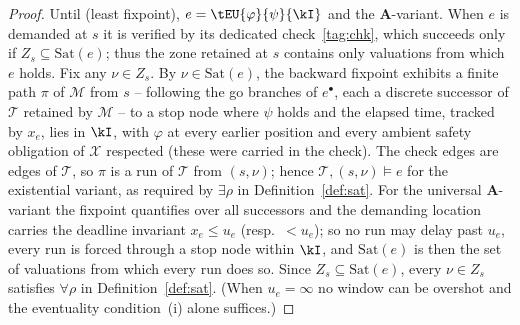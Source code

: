 \begin{proof}
{Until (least fixpoint), $e=\tEU{\varphi}{\psi}{\kI}$ and the $\mathbf{A}$-variant.} When $e$ is demanded at $s$ it is verified by its dedicated check~\eqref{tag:chk}, which succeeds only if $Z_s\subseteq\mathrm{Sat}(e)$; thus the zone retained at $s$ contains {only} valuations from which $e$ holds. Fix any $\nu\in Z_s$. By $\nu\in\mathrm{Sat}(e)$, the backward fixpoint exhibits a finite path $\pi$ of $\mathcal{M}$ from $s$ -- following the go branches of $e^{\bullet}$, each a discrete successor of $\mathcal{T}$ retained by $\mathcal{M}$ -- to a stop node where $\psi$ holds and the elapsed time, tracked by $x_e$, lies in $\kI$, with $\varphi$ at every earlier position and every ambient safety obligation of $\mathcal{X}$ respected (these were carried in the check). The check edges are edges of $\mathcal{T}$, so $\pi$ is a run of $\mathcal{T}$ from $(s,\nu)$; hence $\mathcal{T},(s,\nu)\models e$ for the existential variant, as required by $\exists\rho$ in Definition~\ref{def:sat}. For the universal $\mathbf{A}$-variant the fixpoint quantifies over {all} successors and the demanding location carries the deadline invariant $x_e\le u_e$ (resp.\ $<u_e$); so no run may delay past $u_e$, every run is forced through a stop node within $\kI$, and $\mathrm{Sat}(e)$ is then the set of valuations from which {every} run does so. Since $Z_s\subseteq\mathrm{Sat}(e)$, every $\nu\in Z_s$ satisfies $\forall\rho$ in Definition~\ref{def:sat}. (When $u_e=\infty$ no window can be overshot and the eventuality condition~(i) alone suffices.)


\end{proof}
